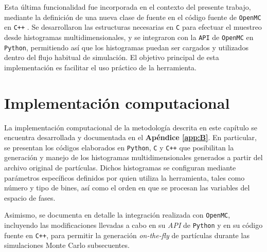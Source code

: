 Esta última funcionalidad fue incorporada en el contexto del presente trabajo, mediante la definición de una nueva clase de fuente en el código fuente de \texttt{OpenMC} en \texttt{C++} \cite{RepositorioKDSource2025} \cite{RepositorioOpenMCSource2025}. Se desarrollaron las estructuras necesarias en \texttt{C} para efectuar el muestreo desde histogramas multidimensionales, y se integraron con la \texttt{API} de \texttt{OpenMC} en \texttt{Python}, permitiendo así que los histogramas puedan ser cargados y utilizados dentro del flujo habitual de simulación. El objetivo principal de esta implementación es facilitar el uso práctico de la herramienta.


\section{Implementación computacional}

La implementación computacional de la metodología descrita en este capítulo se encuentra desarrollada y documentada en el \textbf{Apéndice \ref{app:B}}. En particular, se presentan los códigos elaborados en \texttt{Python}, \texttt{C} y \texttt{C++} que posibilitan la generación y manejo de los histogramas multidimensionales generados a partir del archivo original de partículas. Dichos histogramas se configuran mediante parámetros específicos definidos por quien utiliza la herramienta, tales como número y tipo de bines, así como el orden en que se procesan las variables del espacio de fases.

Asimismo, se documenta en detalle la integración realizada con \texttt{OpenMC}, incluyendo las modificaciones llevadas a cabo en su \textit{API} de \texttt{Python} y en su código fuente en \texttt{C++}, para permitir la generación \textit{on-the-fly} de partículas durante las simulaciones Monte Carlo subsecuentes.
